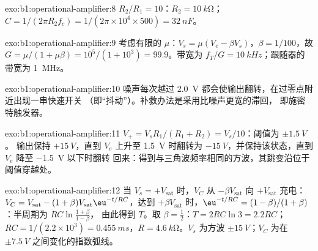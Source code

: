 \begin{solution}{exo:b1:operational-amplifier:8}
$R_2/R_1 = 10$：$R_2 = \qty{10}{k\ohm}$；$C = 1/(2\pi R_2f_c) = 1/(2\pi
\times 10^4 \times 500) = \qty{32}{nF}$。
\end{solution}

\begin{solution}{exo:b1:operational-amplifier:9}
考虑有限的 $\mu$：$V_s = \mu(V_e - \beta V_s)$，$\beta = 1/100$，故
$G = \mu/(1 + \mu\beta) = 10^5/(1 + 10^3) = 99.9$。带宽为 $f_T/G =
\qty{10}{kHz}$；跟随器的带宽为 \qty{1}{MHz}。
\end{solution}

\begin{solution}{exo:b1:operational-amplifier:10}
噪声每次越过 \qty{2.0}{V} 都会使输出翻转，在过零点附近出现一串快速开关
（即“抖动”）。补救办法是采用比噪声更宽的滞回，
即施密特触发器。
\end{solution}

\begin{solution}{exo:b1:operational-amplifier:11}
$V_+ = V_sR_1/(R_1 + R_2) = V_s/10$：阈值为 $\pm\qty{1.5}{V}$。
输出保持 $+\qty{15}{V}$，直到 $V_e$ 上升至 \qty{1.5}{V} 时翻转为
$-\qty{15}{V}$，并保持该状态，直到 $V_e$ 降至 \qty{-1.5}{V} 以下时翻转
回来：得到与三角波频率相同的方波，其跳变沿位于
阈值穿越处。
\end{solution}

\begin{solution}{exo:b1:operational-amplifier:12}
当 $V_s = +V_{\mathrm{sat}}$ 时，$V_C$ 从 $-\beta V_{\mathrm{sat}}$
向 $+V_{\mathrm{sat}}$ 充电：$V_C = V_{\mathrm{sat}} - (1 + \beta)V_{\mathrm{sat}}
\eu^{-t/RC}$，达到 $+\beta V_{\mathrm{sat}}$ 时，$\eu^{-t/RC} =
(1 - \beta)/(1 + \beta)$：半周期为 $RC\ln\frac{1 + \beta}{1 - \beta}$，
由此得到 $T$。取 $\beta = \tfrac12$：$T = 2RC\ln 3 = 2.2RC$；$RC = 1/(2.2 \times
10^3) = \qty{0.455}{ms}$，$R = \qty{4.6}{k\ohm}$。$V_s$ 为方波
$\pm\qty{15}{V}$；$V_C$ 为在 $\pm\qty{7.5}{V}$ 之间变化的指数弧线。
\end{solution}

